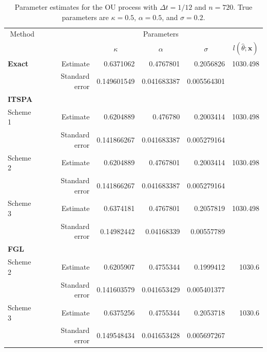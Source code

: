 \begin{table}
	\newcommand{\ra}[1]{\renewcommand{\arraystretch}{#1}}
	\ra{1.3}
	\centering
	\begin{tabular}{@{}lrrrrr@{}}
		\toprule
		\multicolumn{1}{c}{Method}& & \multicolumn{3}{c}{Parameters}\\
		\cmidrule{1-1} \cmidrule{3-5}
		& & \multicolumn{1}{c}{$\kappa$} & \multicolumn{1}{c}{$\alpha$} & \multicolumn{1}{c}{$\sigma$} &\multicolumn{1}{c}{$l(\hat{\theta};\mathbf{x})$} \\
		\midrule
		\textbf{Exact}& Estimate & 0.6371062 & 0.4767801& 0.2056826 & 1030.498 \\
		& Standard error & 0.149601549 & 0.041683387 & 0.005564301\\
		\textbf{ITSPA}\\
		Scheme 1& Estimate & 0.6204889  &  0.476780  &  0.2003414 & 1030.498 \\
		& Standard error & 0.141866267& 0.041683387& 0.005279164& \\
		Scheme 2& Estimate &  0.6204889 &  0.4767801 & 0.2003414& 1030.498\\
		& Standard error & 0.141866267& 0.041683387& 0.005279164& \\
		Scheme 3& Estimate &0.6374181  &  0.4767801&  0.2057819& 1030.498 \\
		& Standard error &0.14982442& 0.04168339&0.00557789& \\
		\textbf{FGL}\\
		Scheme 2 & Estimate& 0.6205907 & 0.4755344 & 0.1999412 & 1030.6\\
		&	Standard error & 0.141603579 & 0.041653429 & 0.005401377\\
		Scheme 3 & Estimate&0.6375256&0.4755344&0.2053718&1030.6\\
		&	Standard error &0.149548434&0.041653428&0.005697267\\
		\bottomrule
	\end{tabular}
	\caption[Parameter estimates: Ornstein-Uhlenbeck process] {Parameter estimates for the OU process with $\Delta t=1/12$ and $n=720$.
		True parameters are $\kappa=0.5$, $\alpha=0.5$, and $\sigma=0.2$.}
	\label{Chap6.2 OU table}
\end{table}



